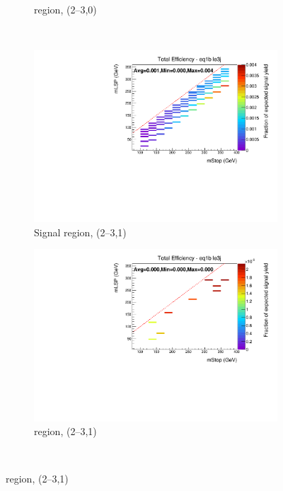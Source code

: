 \begin{figure}[ht!]
\begin{subfigure}[b]{0.47\textwidth}
    \caption{\mj region, (2--3,0)}
    \label{fig:t2cc_mu_eff_le3j_0b}
  \end{subfigure} \\
  \begin{subfigure}[b]{0.47\textwidth}
    \includegraphics[width=\textwidth]{Figs/sms/t2cc/v24/T2cc_v24_had_eff_maps_eq1b_le3j_SITV.pdf}
    \caption{Signal region, (2--3,1)}
    \label{fig:t2cc_sig_eff_le3j_1b}
  \end{subfigure}
  \begin{subfigure}[b]{0.47\textwidth}
    \includegraphics[width=\textwidth]{Figs/sms/t2cc/v24/T2cc_v24_muon_eff_maps_eq1b_le3j_SITV.pdf}
    \caption{\mj region, (2--3,1)}
    \label{fig:t2cc_mu_eff_le3j_1b}
  \end{subfigure} \\

\end{figure}
